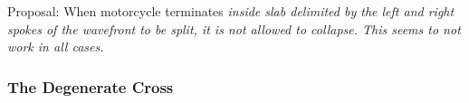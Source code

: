\documentclass[12pt,a4paper,oneside,openany]{article}
\begin{document}
Proposal: When motorcycle terminates \em inside \em slab delimited by the left and right spokes of the wavefront to be split, it is not allowed to collapse. This seems to not work in all cases.

\subsubsection{The Degenerate Cross}

\begin{figure}[htpb]
\begin{center}
\subfigure[Z]{
}
\end{center}
\end{figure}
\end{document}

